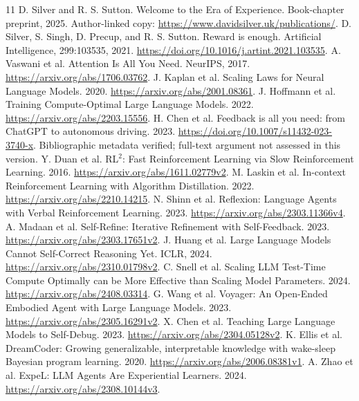 \documentclass[11pt]{article}
\begin{document}
\begingroup\small
\begin{thebibliography}{11}
 D. Silver and R. S. Sutton. Welcome to the Era of Experience.
Book-chapter preprint, 2025. Author-linked copy:
\url{https://www.davidsilver.uk/publications/}.
 D. Silver, S. Singh, D. Precup, and R. S. Sutton.
Reward is enough. Artificial Intelligence, 299:103535, 2021.
\url{https://doi.org/10.1016/j.artint.2021.103535}.
 A. Vaswani et al. Attention Is All You Need. NeurIPS, 2017.
\url{https://arxiv.org/abs/1706.03762}.
 J. Kaplan et al. Scaling Laws for Neural Language Models. 2020.
\url{https://arxiv.org/abs/2001.08361}.
 J. Hoffmann et al. Training Compute-Optimal Large Language Models. 2022.
\url{https://arxiv.org/abs/2203.15556}.
 H. Chen et al. Feedback is all you need: from ChatGPT to autonomous driving. 2023.
\url{https://doi.org/10.1007/s11432-023-3740-x}. Bibliographic metadata verified;
full-text argument not assessed in this version.
 Y. Duan et al. RL$^2$: Fast Reinforcement Learning via Slow Reinforcement Learning. 2016.
\url{https://arxiv.org/abs/1611.02779v2}.
 M. Laskin et al. In-context Reinforcement Learning with Algorithm Distillation. 2022.
\url{https://arxiv.org/abs/2210.14215}.
 N. Shinn et al. Reflexion: Language Agents with Verbal Reinforcement Learning. 2023.
\url{https://arxiv.org/abs/2303.11366v4}.
 A. Madaan et al. Self-Refine: Iterative Refinement with Self-Feedback. 2023.
\url{https://arxiv.org/abs/2303.17651v2}.
 J. Huang et al. Large Language Models Cannot Self-Correct Reasoning Yet. ICLR, 2024.
\url{https://arxiv.org/abs/2310.01798v2}.
 C. Snell et al. Scaling LLM Test-Time Compute Optimally can be More Effective than Scaling Model Parameters. 2024.
\url{https://arxiv.org/abs/2408.03314}.
 G. Wang et al. Voyager: An Open-Ended Embodied Agent with Large Language Models. 2023.
\url{https://arxiv.org/abs/2305.16291v2}.
 X. Chen et al. Teaching Large Language Models to Self-Debug. 2023.
\url{https://arxiv.org/abs/2304.05128v2}.
 K. Ellis et al. DreamCoder: Growing generalizable,
interpretable knowledge with wake-sleep Bayesian program learning. 2020.
\url{https://arxiv.org/abs/2006.08381v1}.
 A. Zhao et al. ExpeL: LLM Agents Are Experiential Learners. 2024.
\url{https://arxiv.org/abs/2308.10144v3}.
\end{thebibliography}
\endgroup
\end{document}

